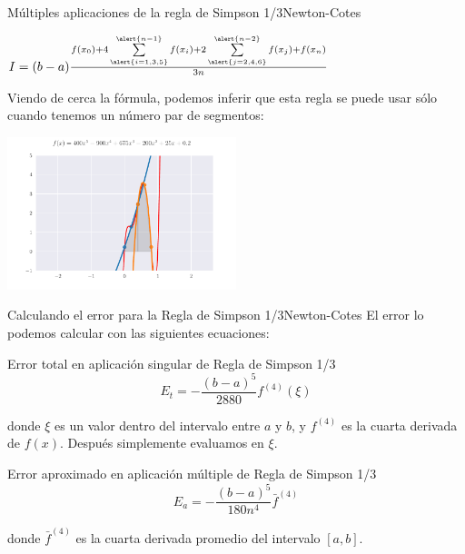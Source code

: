 \documentclass[spanish, c, dvipsnames]{beamer}
\begin{document}
\begin{frame}{Múltiples aplicaciones de la regla de Simpson 1/3}{Newton-Cotes}
    \begin{center}
        $I = (b - a) \frac{f(x_0) + 4 \sum\limits_{\alert{i=1,3,5}}^{\alert{n-1}}f(x_i) + 2 \sum\limits_{\alert{j=2,4,6}}^{\alert{n-2}} f(x_j) + f(x_n)}{3n}$    
    \end{center}
    \bigskip
    Viendo de cerca la fórmula, podemos inferir que esta regla se puede usar sólo cuando tenemos un \alert{número par de segmentos}:
    \begin{center}
        \includegraphics[width=0.5\textwidth]{simpsonmultionethird.pdf}
    \end{center}
\end{frame}

\begin{frame}{Calculando el error para la Regla de Simpson 1/3}{Newton-Cotes}
El error lo podemos calcular con las siguientes ecuaciones:

\begin{block}{Error total en aplicación singular de Regla de Simpson 1/3}
    \begin{equation}
        \label{eq:simpson13-single-error}
        E_t = - \frac{(b - a)^5}{2880}f^{(4)}(\xi)
    \end{equation}
\end{block}

donde $\xi$ es un valor dentro del intervalo entre $a$ y $b$, y $f^{(4)}$ es la cuarta derivada de $f(x)$. Después simplemente evaluamos en $\xi$.

\bigskip

\begin{exampleblock}{Error aproximado en aplicación múltiple de Regla de Simpson 1/3}
    \begin{equation}
        \label{eq:simpson13-multi-error}
        E_a = -\frac{(b - a)^5}{180 n^4} \bar{f}^{(4)}
    \end{equation}
\end{exampleblock}

donde $\bar{f}^{(4)}$ es la cuarta derivada promedio del intervalo $[a, b]$.
\end{frame}
\end{document}
